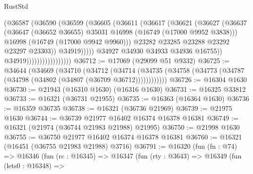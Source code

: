 \begin{lexlean}{RustStd}
\begin{coremodule}
                                        (@36587
                                          (@36590
                                            (@36599
                                              (@36605
                                                (@36611
                                                  (@36617
                                                    (@36621
                                                      (@36627
                                                        (@36637
                                                          (@36647
                                                            (@36652 @36655)
                                                            @35031
                                                            @16998
                                                            (@16749 (@17000 @9952 @3838)))
                                                          @16998
                                                          (@16749 (@17000 @9942 @9960)))
                                                        @23282
                                                        @23285
                                                        @23288
                                                        @23292
                                                        @23297
                                                        @23303))
                                                    @34919)))))
                                          @34927
                                          @34930
                                          @34933
                                          @34936
                                          @16755))
                                      @34919)))))))))))))))))
@36712 := @17069 (@29099 @51 @9332)
@36725 := @34644
    (@34669
      (@34710
        (@34712
          (@34714 (@34735 (@34758 (@34773 (@34787 (@34798 (@34802 (@34807 (@36709 @36712))))))))))))
@36726 := @16304 @1630
@36730 := @21943 (@16310 @1630) (@16316 @1630)
@36731 := @16325 @33812
@36733 := @16321 (@36731 @21955)
@36735 := @16363 (@16364 @1630)
@36736 := @16359 @36735
@36738 := @16321 (@36736 @21969)
@36739 := @21975 @1630
@36744 := @36739 @21977 @16402 @16374 @16378 @16381
@36749 := @16321 (@21974 (@36744 @21983 @21988) @21995)
@36750 := @21998 @1630
@36755 := @36750 @21977 @16402 @16374 @16378 @16381
@36760 := @16321 (@16451 (@36755 @21983 @21988) @3716)
@36791 := @16320
    (fun (fn : @74) =>
    @16346
      (fun (rc : @16345) =>
      @16347
        (fun (rty : @3643) =>
        @16349
          (fun (lets0 : @16348) =>

\end{coremodule}
\end{lexlean}
